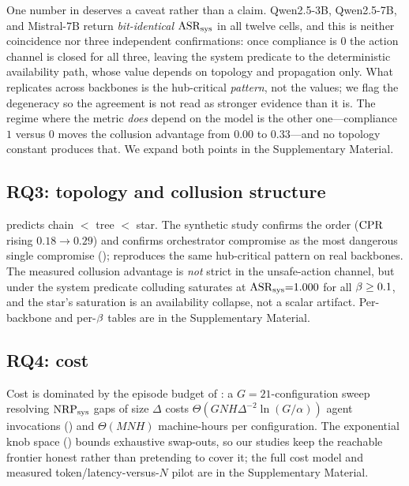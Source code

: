 One number in  deserves a caveat rather than a claim. Qwen2.5-3B,
Qwen2.5-7B, and Mistral-7B return \emph{bit-identical} $\mathrm{ASR}_{\mathrm{sys}}$ in all twelve cells, and
this is neither coincidence nor three independent confirmations: once compliance is $0$ the
action channel is closed for all three, leaving the system predicate to the deterministic
availability path, whose value depends on topology and propagation only. What replicates
across backbones is the hub-critical \emph{pattern}, not the values; we flag the
degeneracy so the agreement is not read as stronger evidence than it is. The regime where
the metric \emph{does} depend on the model is the other one---compliance $1$ versus $0$
moves the collusion advantage from $0.00$ to $0.33$---and no topology constant produces
that. We expand both points in the Supplementary Material.

\subsection{RQ3: topology and collusion structure}
 predicts chain $<$ tree $<$ star. The synthetic study confirms the
order ($\mathrm{CPR}$ rising $0.18\to0.29$) and confirms orchestrator compromise as the most
dangerous single compromise ();  reproduces the same
hub-critical pattern on real backbones. The measured collusion advantage is \emph{not}
strict in the unsafe-action channel, but under the system predicate colluding saturates at
$\mathrm{ASR}_{\mathrm{sys}}{=}1.000$ for all $\beta\ge0.1$, and the star's saturation is an availability
collapse, not a scalar artifact. Per-backbone and per-$\beta$ tables are in the
Supplementary Material.
\subsection{RQ4: cost}
\label{sec:rq4}
Cost is dominated by the episode budget of : a $G{=}21$-configuration sweep
resolving $\mathrm{NRP}_{\mathrm{sys}}$ gaps of size $\Delta$ costs $\Theta(GNH\Delta^{-2}\ln(G/\alpha))$ agent
invocations () and $\Theta(MNH)$ machine-hours per configuration. The
exponential knob space () bounds exhaustive swap-outs, so our studies keep
the reachable frontier honest rather than pretending to cover it; the full cost model and
measured token/latency-versus-$N$ pilot are in the Supplementary Material.